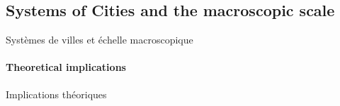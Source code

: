 




\subsection{Systems of Cities and the macroscopic scale}{Systèmes de villes et échelle macroscopique}






\paragraph{Theoretical implications}{Implications théoriques}


